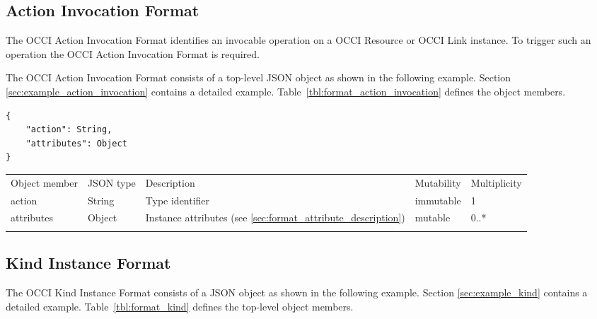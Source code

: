 \documentclass[10pt,a4paper]{article}
\begin{document}
\subsection{Action Invocation Format}
\label{sec:format_action_invocation}

The OCCI Action Invocation  Format identifies an invocable operation on a OCCI Resource or
OCCI Link instance. To trigger such an operation the OCCI Action Invocation
Format is required.

The OCCI Action Invocation Format consists of a top-level JSON object as shown in the
following example. Section \ref{sec:example_action_invocation} contains a detailed example.
Table~\ref{tbl:format_action_invocation} defines the object members.
\begin{lstlisting}
{
    "action": String,
    "attributes": Object
}
\end{lstlisting}
 {
    \begin{tabularx}{\textwidth}{llXll}
    \toprule
    Object member & JSON type & Description & Mutability & Multiplicity \\
    \colrule
    action & String & Type identifier & immutable & 1 \\

    attributes & Object & Instance attributes (see
\ref{sec:format_attribute_description}) & mutable & 0..* \\
    \botrule
    \end{tabularx}
}

\subsection{Kind Instance Format}
\label{sec:format_kind}

The OCCI Kind Instance Format consists of a JSON object as shown in the
following example. Section \ref{sec:example_kind} contains a detailed example.
Table~\ref{tbl:format_kind} defines the top-level object members.
\end{document}
